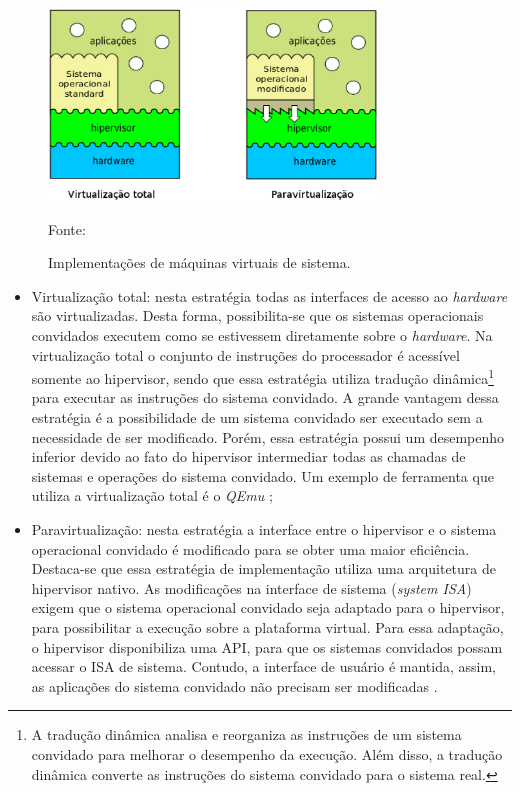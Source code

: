 \begin{figure}[h!]
 \centering
 \includegraphics[width=330px]{img/vms_implementacao.eps}
 \caption{Implementações de máquinas virtuais de sistema.}
 \label{fig:vms_implementacao}
 Fonte: \citet{maziero2013}
\end{figure}

\begin{itemize}
 \item Virtualização total: nesta estratégia todas as interfaces de acesso ao \textit{hardware} são virtualizadas. Desta forma, possibilita-se 
 que os sistemas operacionais convidados executem como se estivessem diretamente sobre o \textit{hardware}. Na virtualização total o conjunto de 
 instruções do processador é acessível somente ao hipervisor, sendo que essa estratégia utiliza tradução dinâmica\footnote[1]{A tradução dinâmica 
 analisa e reorganiza as instruções de um sistema convidado para melhorar o desempenho da execução. Além disso, a tradução dinâmica converte as 
 instruções do sistema convidado para o sistema real.} para executar as instruções do sistema convidado. A grande vantagem dessa estratégia é a 
 possibilidade de um sistema convidado ser executado sem a necessidade de ser modificado. Porém, essa estratégia possui um desempenho inferior 
 devido ao fato do hipervisor intermediar todas as chamadas de sistemas e operações do sistema convidado. Um exemplo de ferramenta que utiliza 
 a virtualização total é o \textit{QEmu} \cite{qemu};
 \item Paravirtualização: nesta estratégia a interface entre o hipervisor e o sistema operacional convidado é modificado para se obter uma 
 maior eficiência. Destaca-se que essa estratégia de implementação utiliza uma arquitetura de hipervisor nativo. 
 As modificações na interface de sistema (\textit{system \ac{ISA}}) exigem que o sistema operacional convidado seja adaptado para o hipervisor, 
 para possibilitar a execução sobre a plataforma virtual. Para essa adaptação, o hipervisor disponibiliza uma \ac{API}, para que os 
 sistemas convidados possam acessar o \ac{ISA} de sistema. Contudo, a interface de usuário é mantida, assim, as aplicações do sistema convidado 
 não precisam ser modificadas \cite{maziero2013}.
\end{itemize}

